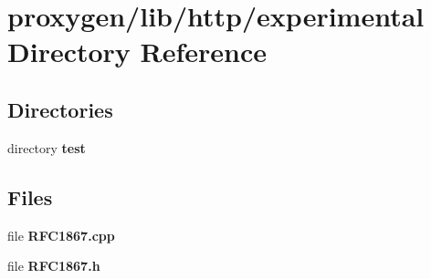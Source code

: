 \section{proxygen/lib/http/experimental Directory Reference}
\label{dir_b837f7b820561d430f20ba5cc70e7533}
\subsection*{Directories}
\begin{DoxyCompactItemize}
\item 
directory {\bf test}
\end{DoxyCompactItemize}
\subsection*{Files}
\begin{DoxyCompactItemize}
\item 
file {\bf R\+F\+C1867.\+cpp}
\item 
file {\bf R\+F\+C1867.\+h}
\end{DoxyCompactItemize}

